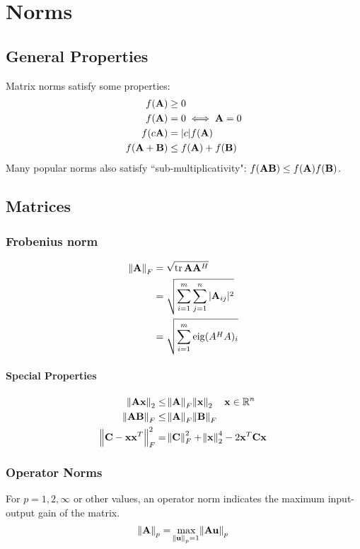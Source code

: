 \chapter{Norms}

\section{General Properties}
Matrix norms satisfy some properties:
\begin{align}
f(\mathbf{A})    &\ge 0             \\
f(\mathbf{A})    &=   0  \iff \mathbf{A}=0 \\
f(c\mathbf{A})   &=   |c|f(\mathbf{A})     \\
f(\mathbf{A}+\mathbf{B})&\le f(\mathbf{A})+f(\mathbf{B})
\end{align}
Many popular norms also satisfy ``sub-multiplicativity": $f(\mathbf{A}\mathbf{B})\le f(\mathbf{A})f(\mathbf{B})$.

\section{Matrices}

\subsection{Frobenius norm}
\begin{align}
\norm{\mathbf{A}}_F &= \sqrt{\operatorname{tr}\mathbf{A}\mathbf{A}^H}                           \\
             &= \sqrt{\sum_{i=1}^m \sum_{j=1}^n |\mathbf{A}_{ij}|^2 }  \\
             &= \sqrt{\sum_{i=1}^m \operatorname{eig}(A^H A)_i }
\end{align}

\subsubsection{Special Properties}
\begin{align}
\norm{\mathbf{A}\mathbf{x}}_2         &\le \norm{\mathbf{A}}_F \norm{\mathbf{x}}_2~~~\mathbf{x}\in\mathbb{R}^{n} \\
\norm{\mathbf{A}\mathbf{B}}_F         &\le \norm{\mathbf{A}}_F \norm{\mathbf{B}}_F \\
\norm{\mathbf{C}-\mathbf{x}\mathbf{x}^T}_F^2 &= \norm{\mathbf{C}}_F^2+\norm{\mathbf{x}}_2^4-2 \mathbf{x}^T \mathbf{C} \mathbf{x}
\end{align}

\subsection{Operator Norms}
For $p=1,2,\infty$ or other values, an operator norm indicates the maximum input-output gain of the matrix.
\begin{equation}
\norm{\mathbf{A}}_p=\max_{\norm{\mathbf{u}}_p=1} \norm{\mathbf{A}\mathbf{u}}_p
\end{equation}

